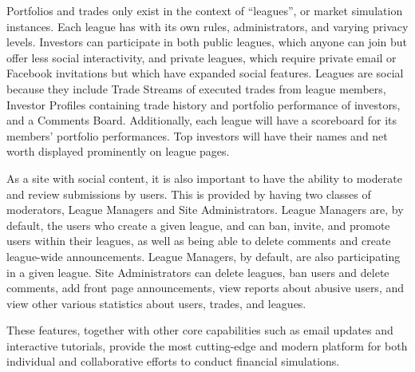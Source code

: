 Portfolios and trades only exist in the context of “leagues”, or market simulation instances. Each league has with its own rules, administrators, and varying privacy levels. Investors can participate in both public leagues, which anyone can join but offer less social interactivity, and private leagues, which require private email or Facebook invitations but which have expanded social features. Leagues are social because they include Trade Streams of executed trades from league members, Investor Profiles containing trade history and portfolio performance of investors, and a Comments Board. Additionally, each league will have a scoreboard for its members’ portfolio performances. Top investors will have their names and net worth displayed prominently on league pages. 

As a site with social content, it is also important to have the ability to moderate and review submissions by users. This is provided by having two classes of moderators, League Managers and Site Administrators. League Managers are, by default, the users who create a given league, and can ban, invite, and promote users within their leagues, as well as being able to delete comments and create league-wide announcements. League Managers, by default, are also participating in a given league. Site Administrators can delete leagues, ban users and delete comments, add front page announcements, view reports about abusive users, and view other various statistics about users, trades, and leagues.

These features, together with other core capabilities such as email updates and interactive tutorials, provide the most cutting-edge and modern platform for both individual and collaborative efforts to conduct financial simulations.
